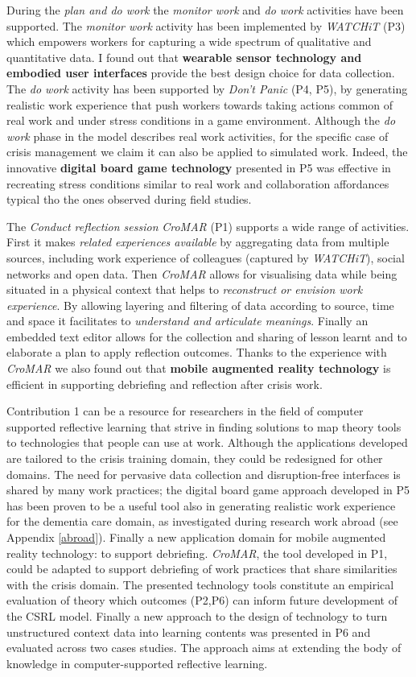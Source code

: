 During the \emph{plan and do work} the \emph{monitor work} and \emph{do work} activities have been supported. The \emph{monitor work} activity has been implemented by \emph{WATCHiT} (P3) which empowers workers for capturing a wide spectrum of qualitative and quantitative data. I found out that \textbf{wearable sensor technology and embodied user interfaces} provide the best design choice for data collection. The \emph{do work} activity has been supported by \emph{Don't Panic} (P4, P5), by generating realistic work experience that push workers towards taking actions common of real work and under stress conditions in a game environment. Although the \emph{do work} phase in the model describes real work activities, for the specific case of crisis management we claim it can also be applied to simulated work. Indeed, the innovative \textbf{digital board game technology} presented in P5 was effective in recreating stress conditions similar to real work and collaboration affordances typical tho the ones observed during field studies.

The \emph{Conduct reflection session} \emph{CroMAR} (P1) supports a wide range of activities. First it makes \emph{related experiences available} by aggregating data from multiple sources, including work experience of colleagues (captured by \emph{WATCHiT}), social networks and open data. Then \emph{CroMAR} allows for visualising data while being situated in a physical context that helps to \emph{reconstruct or envision work experience}. By allowing layering and filtering of data according to source, time and space it facilitates to \emph{understand and articulate meanings}. Finally an embedded text editor allows for the collection and sharing of lesson learnt and to elaborate a plan to apply reflection outcomes. Thanks to the experience with \emph{CroMAR} we also found out that \textbf{mobile augmented reality technology} is efficient in supporting debriefing and reflection after crisis work.

Contribution 1 can be a resource for researchers in the field of computer supported reflective learning that strive in finding solutions to map theory tools to technologies that people can use at work. Although the applications developed are tailored to the crisis training domain, they could be redesigned for other domains. The need for pervasive data collection and disruption-free interfaces is shared by many work practices; the digital board game approach developed in P5 has been proven to be a useful tool also in generating realistic work experience for the dementia care domain, as investigated during research work abroad (see Appendix \ref{abroad}). Finally a new application domain for mobile augmented reality technology: to support debriefing. \emph{CroMAR}, the tool developed in P1, could be adapted to support debriefing of work practices that share similarities with the crisis domain. The presented technology tools constitute an empirical evaluation of theory which outcomes (P2,P6) can inform future development of the CSRL model. Finally a new approach to the design of technology to turn unstructured context data into learning contents was presented in P6 and evaluated across two cases studies. The approach aims at extending the body of knowledge in computer-supported reflective learning.

